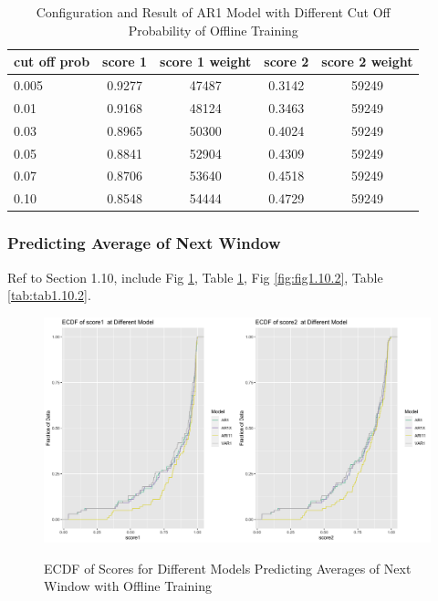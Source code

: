 \documentclass{article}
\begin{document}
\begin{table}[htbp]
  \begin{center}
    \caption{Configuration and Result of AR1 Model with Different Cut Off Probability of Offline Training}
    \label{tab:tab1.9.1}
    \begin{tabular}{l|*{4}{c}}
      \textbf{cut off prob} & \textbf{score 1} & \textbf{score 1 weight} & \textbf{score 2} & \textbf{score 2 weight} \\
      \hline
      0.005 & 0.9277 & 47487 & 0.3142 & 59249\\
      0.01 & 0.9168 & 48124 & 0.3463 & 59249\\
      0.03 & 0.8965 & 50300 & 0.4024 & 59249\\
      0.05 & 0.8841 & 52904 & 0.4309 & 59249\\
      0.07 & 0.8706 & 53640 & 0.4518 & 59249\\
      0.10 & 0.8548 & 54444 & 0.4729 & 59249\\
    \end{tabular}
  \end{center}
\end{table}

\subsubsection{Predicting Average of Next Window}
Ref to Section 1.10, include Fig \ref{fig:fig1.10.1}, Table \ref{fig:fig1.10.1}, Fig \ref{fig:fig1.10.2}, Table \ref{tab:tab1.10.2}.

\begin{figure}
    \caption{ECDF of Scores for Different Models Predicting Averages of Next Window with Offline Training}
    \centering
    \includegraphics{images/ECDFofscoresatDifferentModelOfAR1,AR1X,ARI11,VAR1.png}
    \label{fig:fig1.10.1}
\end{figure}
\end{document}
